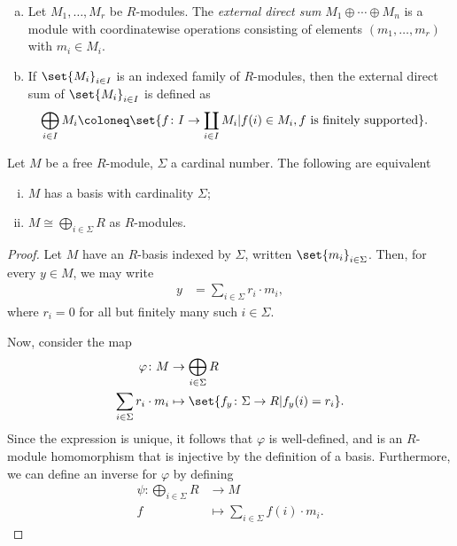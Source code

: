 \documentclass[10pt]{mypackage}
\begin{document}
\begin{definition}\hfill
  \begin{enumerate}[(a)]
    \item Let $M_1,\dots,M_r$ be $R$-modules. The \textit{external direct sum} $M_1\oplus\cdots\oplus M_n$ is a module with coordinatewise operations consisting of elements $\left( m_1,\dots,m_r \right)$ with $m_i\in M_i$.
    \item If $\set{M_i}_{i\in I}$ is an indexed family of $R$-modules, then the external direct sum of $\set{M_i}_{i\in I}$ is defined as
      \begin{align*}
        \bigoplus_{i\in I}M_i &\coloneq \set{f\colon I\rightarrow \coprod_{i\in I}M_i | f(i)\in M_i, f\text{ is finitely supported}}.
      \end{align*}
  \end{enumerate}
\end{definition}
\begin{theorem}
  Let $M$ be a free $R$-module, $\Sigma$ a cardinal number. The following are equivalent
  \begin{enumerate}[(i)]
    \item $M$ has a basis with cardinality $\Sigma$;
    \item $M\cong \bigoplus_{i\in \Sigma}R$ as $R$-modules.
  \end{enumerate}
\end{theorem}
\begin{proof}
  Let $M$ have an $R$-basis indexed by $\Sigma$, written $\set{m_i}_{i\in \Sigma}$. Then, for every $y\in M$, we may write
  \begin{align*}
    y &= \sum_{i\in \Sigma} r_i\cdot m_i,
  \end{align*}
  where $r_i = 0$ for all but finitely many such $i\in \Sigma$.\newline

  Now, consider the map
  \begin{align*}
    \varphi\colon M&\rightarrow \bigoplus_{i\in \Sigma}R\\
    \sum_{i\in\Sigma}r_i\cdot m_i &\mapsto \set{f_y\colon \Sigma\rightarrow R | f_y(i) = r_i}.
  \end{align*}
  Since the expression is unique, it follows that $\varphi$ is well-defined, and is an $R$-module homomorphism that is injective by the definition of a basis. Furthermore, we can define an inverse for $\varphi$ by defining
  \begin{align*}
    \psi\colon \bigoplus_{i\in\Sigma}R &\rightarrow M\\
    f &\mapsto \sum_{i\in\Sigma}f(i)\cdot m_i.
  \end{align*}

\end{proof}
\end{document}
